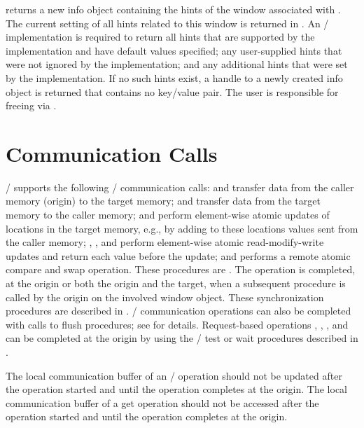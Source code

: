  returns a new info object containing
the hints of the window associated with .
The current setting of all hints related to this window is returned in
.  An \MPI/ implementation is required to return all hints
that are supported by the implementation and have default values
specified; any user-supplied hints that were not ignored by the
implementation; and any additional hints that were set by the
implementation.
If no such hints exist, a handle to a newly created info object is returned that contains no key/value pair.
The user is responsible for freeing  via .

\section{Communication Calls}
\label{sec:onesided-putget}

\MPI/ supports the following \RMA/ communication calls: 
and  transfer data from the
caller memory (origin) to the target memory;
 and  transfer data from the target memory to the caller
memory;
 and  perform element-wise atomic updates of locations in the target memory,
e.g., by adding to these locations values sent from the caller
memory; , , and
 perform element-wise atomic read-modify-write updates and return each value before the update; and
 performs a remote atomic compare and swap
operation.
These procedures are .
The operation is completed, at the origin or both the origin and the target, when
a subsequent  procedure is called by the origin on
the involved window object.  These synchronization procedures are described in
.
\RMA/ communication operations can also be completed with calls to flush procedures; see
 for details. Request-based operations
, ,
, and
 can be
completed at the origin by using the \MPI/ test or wait procedures described in
.

The local communication buffer of an \RMA/ operation should not be updated after the operation started and
until the operation completes at the origin.
The local communication buffer of a get operation should not be accessed after the operation started and until the
operation completes at the origin.

